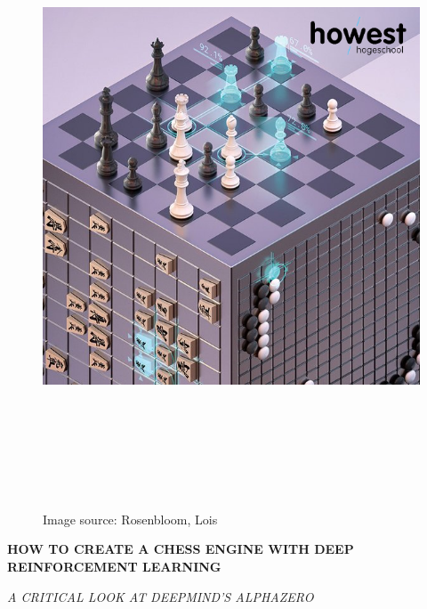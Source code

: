 \documentclass{article}
\begin{document}
\begin{titlepage}
    \begin{figure}[H]
        \centering
        \includegraphics[width=18.5cm,height=18.5cm]{img/titlepage-cover.png}
        \caption{Image source: Rosenbloom, Lois {\cite{rosenbloomTopDogAlphaZero2019}}}
    \end{figure}
    \begin{adjustwidth}{1.5cm}{1.5cm}

    \vspace{0.5em}

    \MakeUppercase{\Huge\textbf{How to create a chess engine with Deep Reinforcement Learning}}

    \MakeUppercase{\Large\textit{A critical look at DeepMind's AlphaZero}}

    \vspace{1em}


\end{adjustwidth}
\end{titlepage}
\end{document}
